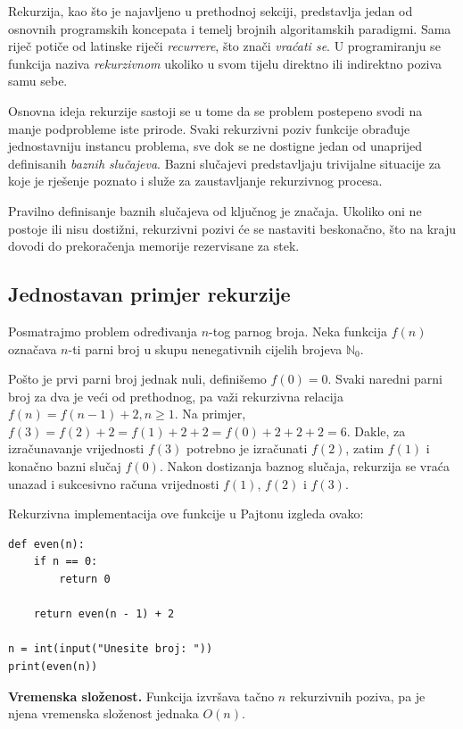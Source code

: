 Rekurzija, kao što je najavljeno u prethodnoj sekciji, predstavlja jedan od osnovnih programskih koncepata i temelj brojnih algoritamskih paradigmi. Sama riječ potiče od latinske riječi \textit{recurrere}, što znači \emph{vraćati se}. U programiranju se funkcija naziva \textit{rekurzivnom} ukoliko u svom tijelu direktno ili indirektno poziva samu sebe.

Osnovna ideja rekurzije sastoji se u tome da se problem postepeno svodi na manje podprobleme iste prirode. Svaki rekurzivni poziv funkcije obrađuje jednostavniju instancu problema, sve dok se ne dostigne jedan od unaprijed definisanih \textit{baznih slučajeva}. Bazni slučajevi predstavljaju trivijalne situacije za koje je rješenje poznato i služe za zaustavljanje rekurzivnog procesa.

Pravilno definisanje baznih slučajeva od ključnog je značaja. Ukoliko oni ne postoje ili nisu dostižni, rekurzivni pozivi će se nastaviti beskonačno, što na kraju dovodi do prekoračenja memorije rezervisane za stek.

\subsection{Jednostavan primjer rekurzije}

Posmatrajmo problem određivanja $n$-tog parnog broja. Neka funkcija $f(n)$ označava $n$-ti parni broj u skupu nenegativnih cijelih brojeva $\mathbb{N}_0$.

Pošto je prvi parni broj jednak nuli, definišemo $
f(0)=0.$  Svaki naredni parni broj za dva je veći od prethodnog, pa važi rekurzivna relacija $f(n)=f(n-1)+2, n\geq 1.$ Na primjer, $f(3)=f(2)+2=f(1)+2+2=f(0)+2+2+2=6.$  Dakle, za izračunavanje vrijednosti $f(3)$ potrebno je izračunati $f(2)$, zatim $f(1)$ i konačno bazni slučaj $f(0)$. Nakon dostizanja baznog slučaja, rekurzija se vraća unazad i sukcesivno računa vrijednosti $f(1)$, $f(2)$ i $f(3)$.

Rekurzivna implementacija ove funkcije u Pajtonu izgleda ovako:

\begin{verbatim}
def even(n):
    if n == 0:
        return 0

    return even(n - 1) + 2

n = int(input("Unesite broj: "))
print(even(n))
\end{verbatim}

\textbf{Vremenska složenost.}
Funkcija izvršava tačno $n$ rekurzivnih poziva, pa je njena vremenska složenost jednaka $
O(n).$

